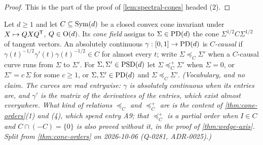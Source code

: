 \begin{proof}
\leanok
This is the part of the proof of \ref{lem:spectral-cones} headed (2).
\end{proof}

\begin{definition}
\label{def:cone-orders-curves}
\leanok
Let $d \ge 1$ and let $C \subseteq \mathrm{Sym}(d)$ be a closed convex cone invariant under $X \mapsto QXQ^{\mathsf{T}}$,
$Q \in \mathrm{O}(d)$. Its \emph{cone field} assigns to $\Sigma \in \mathrm{PD}(d)$ the cone
$\Sigma^{1/2}C\Sigma^{1/2}$ of tangent vectors. An absolutely continuous $\gamma : [0,1] \to \mathrm{PD}(d)$ is
\emph{$C$-causal} if $\gamma(t)^{-1/2}\gamma'(t)\gamma(t)^{-1/2} \in C$ for almost every $t$; write
$\Sigma \preceq_C \Sigma'$ when a $C$-causal curve runs from $\Sigma$ to $\Sigma'$. For
$\Sigma, \Sigma' \in \mathrm{PSD}(d)$ let $\Sigma \preceq^+_C \Sigma'$ when $\Sigma = 0$, or $\Sigma' = c\,\Sigma$ for
some $c \ge 1$, or $\Sigma, \Sigma' \in \mathrm{PD}(d)$ and $\Sigma \preceq_C \Sigma'$.
\statusT\quad\emph{(Vocabulary, and no claim. The curves are read entrywise: $\gamma$ is absolutely
continuous when its entries are, and $\gamma'$ is the matrix of the derivatives of the entries, which exist
almost everywhere. What kind of relations $\preceq_C$ and $\preceq^+_C$ are is the content of
\ref{thm:cone-orders}(1) and (4), which spend entry A9; that $\preceq^+_C$ is a partial order when $I \in C$
and $C \cap (-C) = \{0\}$ is also proved without it, in the proof of \ref{thm:wedge-axis}. Split from \ref{thm:cone-orders} on 2026-10-06 (Q-0281, ADR-0025).)}
\end{definition}

